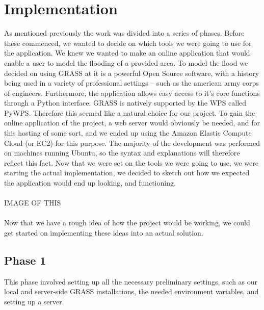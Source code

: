 
\chapter{Implementation} %

\label{ch:theory} %


As mentioned previously the work was divided into a series of phases. Before these commenced, we wanted to decide on which tools we were going to use for the application. 
We knew we wanted to make an online application that would enable a user to model the flooding of a provided area.  
To model the flood we decided on using GRASS at it is a powerful Open Source software, with a history being used in a variety of professional settings – such as the american army corps of engineers. Furthermore, the application allows easy access to it's core functions through a Python interface. 
GRASS is natively supported by the WPS called PyWPS. Therefore this seemed like a natural choice for our project. 
To gain the online application of the project, a web server would obviously be needed, and for this hosting of some sort, and we ended up using the Amazon Elastic Compute Cloud (or EC2) for this purpose.
The majority of the development was performed on machines running Ubuntu, so the syntax and explanations will therefore reflect this fact.
Now that we were set on the tools we were going to use, we were starting the actual implementation, we decided to sketch out how we expected the application would end up looking, and functioning.\\
\\

IMAGE OF THIS\\
\\

Now that we have a rough idea of how the project would be working, we could get started on implementing these ideas into an actual solution.

\section{Phase 1}
This phase involved setting up all the necessary preliminary settings, such as our local and server-side GRASS installations, the needed environment variables, and setting up a server. \\

